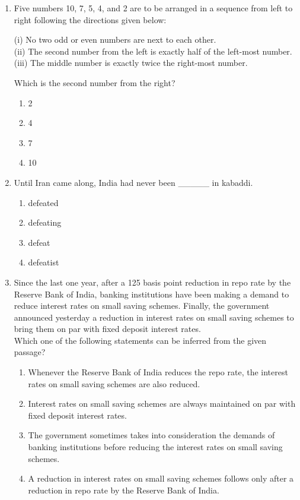 \documentclass[article]{IEEEtran}
\numberwithin{figure}{enumi}
\begin{document}
\begin{enumerate}
    \item Five numbers 10, 7, 5, 4, and 2 are to be arranged in a sequence from left to right following the directions given below:
   
        (i) No two odd or even numbers are next to each other.\\
        (ii) The second number from the left is exactly half of the left-most number.\\
        (iii) The middle number is exactly twice the right-most number.
  
    Which is the second number from the right?
    \begin{enumerate}
        \item 2
        \item 4
        \item 7
        \item 10
    \end{enumerate}
    
    \item Until Iran came along, India had never been \_\_\_\_\_ in kabaddi.
    \begin{enumerate}
        \item defeated
        \item defeating
        \item defeat
        \item defeatist
    \end{enumerate}


\item Since the last one year, after a 125 basis point reduction in repo rate by the Reserve Bank of India, banking institutions have been making a demand to reduce interest rates on small saving schemes. Finally, the government announced yesterday a reduction in interest rates on small saving schemes to bring them on par with fixed deposit interest rates. \\
    Which one of the following statements can be inferred from the given passage?
    \begin{enumerate}
        \item Whenever the Reserve Bank of India reduces the repo rate, the interest rates on small saving schemes are also reduced.
        \item Interest rates on small saving schemes are always maintained on par with fixed deposit interest rates.
        \item The government sometimes takes into consideration the demands of banking institutions before reducing the interest rates on small saving schemes.
        \item A reduction in interest rates on small saving schemes follows only after a reduction in repo rate by the Reserve Bank of India.
    \end{enumerate}
    

\end{enumerate}
\end{document}
